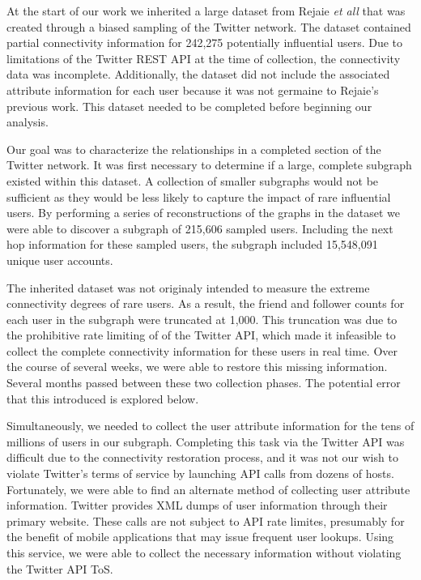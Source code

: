 At the start of our work we inherited a large dataset from Rejaie \textit{et all} that was created through a biased sampling of the Twitter network.  The dataset contained partial connectivity information for 242,275 potentially influential users.  Due to limitations of the Twitter REST API at the time of collection, the connectivity data was incomplete.  Additionally, the dataset did not include the associated attribute information for each user because it was not germaine to Rejaie's previous work.  This dataset needed to be completed before beginning our analysis.

Our goal was to characterize the relationships in a completed section of the Twitter network.  It was first necessary to determine if a large, complete subgraph existed within this dataset.  A collection of smaller subgraphs would not be sufficient as they would be less likely to capture the impact of rare influential users.  By performing a series of reconstructions of the graphs in the dataset we were able to discover a subgraph of 215,606 sampled users.  Including the next hop information for these sampled users, the subgraph included 15,548,091 unique user accounts.

The inherited dataset was not originaly intended to measure the extreme connectivity degrees of rare users.  As a result, the friend and follower counts for each user in the subgraph were truncated at 1,000.  This truncation was due to the prohibitive rate limiting of of the Twitter API, which made it infeasible to collect the complete connectivity information for these users in real time.  Over the course of several weeks, we were able to restore this missing information.  Several months passed between these two collection phases.  The potential error that this introduced is explored below.

Simultaneously, we needed to collect the user attribute information for the tens of millions of users in our subgraph.  Completing this task via the Twitter API was difficult due to the connectivity restoration process, and it was not our wish to violate Twitter's terms of service by launching API calls from dozens of hosts.  Fortunately, we were able to find an alternate method of collecting user attribute information.  Twitter provides XML dumps of user information through their primary website.  These calls are not subject to API rate limites, presumably for the benefit of mobile applications that may issue frequent user lookups.  Using this service, we were able to collect the necessary information without violating the Twitter API ToS.


